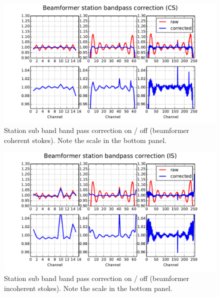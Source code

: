 \documentclass[a4paper,twoside, 10pt]{report}
\begin{document}
\begin{figure}
\includegraphics[width=\columnwidth]{cs-station-bandpass-correction}
\caption{Station sub band band pass correction on / off (beamformer
  coherent stokes). Note the scale in the bottom panel.}
\label{fig:station-subband-bandpass-cs}
\end{figure}



\begin{figure}
\includegraphics[width=\columnwidth]{is-station-bandpass-correction}
\caption{Station sub band band pass correction on / off (beamformer
  incoherent stokes). Note the scale in the bottom panel.}
\label{fig:station-subband-bandpass-is}
\end{figure}
\end{document}

